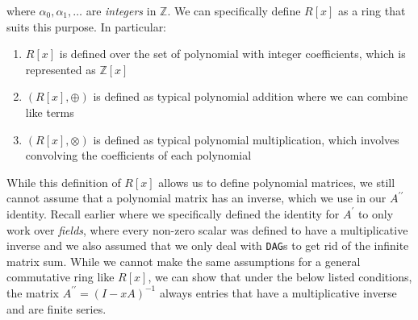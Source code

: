 \documentclass[12pt]{article}
\begin{document}
where $\alpha_0, \alpha_1, \ldots$ are \emph{integers} in $\mathds{Z}$. We can specifically define $R[x]$ as a ring that suits this purpose. In particular:

\begin{enumerate}
    \item $R[x]$ is defined over the set of polynomial with integer coefficients, which is represented as $\mathds{Z}[x]$
    \item $(R[x], \oplus)$ is defined as typical polynomial addition where we can combine like terms
    \item $(R[x], \otimes)$ is defined as typical polynomial multiplication, which involves convolving the coefficients of each polynomial
\end{enumerate}

While this definition of $R[x]$ allows us to define polynomial matrices, we still cannot assume that a polynomial matrix has an inverse, which we use in our $A^{\prime \prime}$ identity. Recall earlier where we specifically defined the identity for $A^{\prime}$ to only work over \emph{fields}, where every non-zero scalar was defined to have a multiplicative inverse and we also assumed that we only deal with \texttt{DAG}s to get rid of the infinite matrix sum. While we cannot make the same assumptions for a general commutative ring like $R[x]$, we can show that under the below listed conditions, the matrix $A^{\prime \prime} = (I - xA)^{-1}$ always entries that have a multiplicative inverse and are finite series.
\end{document}
